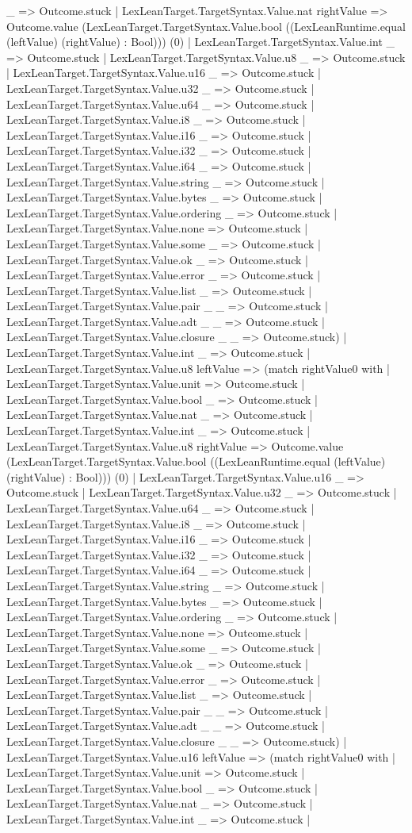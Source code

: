 \documentclass[11pt]{article}
\begin{document}
\_ => Outcome.stuck | LexLeanTarget.TargetSyntax.Value.nat rightValue => Outcome.value (LexLeanTarget.TargetSyntax.Value.bool ((LexLeanRuntime.equal (leftValue) (rightValue) : Bool))) (0) | LexLeanTarget.TargetSyntax.Value.int \_ => Outcome.stuck | LexLeanTarget.TargetSyntax.Value.u8 \_ => Outcome.stuck | LexLeanTarget.TargetSyntax.Value.u16 \_ => Outcome.stuck | LexLeanTarget.TargetSyntax.Value.u32 \_ => Outcome.stuck | LexLeanTarget.TargetSyntax.Value.u64 \_ => Outcome.stuck | LexLeanTarget.TargetSyntax.Value.i8 \_ => Outcome.stuck | LexLeanTarget.TargetSyntax.Value.i16 \_ => Outcome.stuck | LexLeanTarget.TargetSyntax.Value.i32 \_ => Outcome.stuck | LexLeanTarget.TargetSyntax.Value.i64 \_ => Outcome.stuck | LexLeanTarget.TargetSyntax.Value.string \_ => Outcome.stuck | LexLeanTarget.TargetSyntax.Value.bytes \_ => Outcome.stuck | LexLeanTarget.TargetSyntax.Value.ordering \_ => Outcome.stuck | LexLeanTarget.TargetSyntax.Value.none => Outcome.stuck | LexLeanTarget.TargetSyntax.Value.some \_ => Outcome.stuck | LexLeanTarget.TargetSyntax.Value.ok \_ => Outcome.stuck | LexLeanTarget.TargetSyntax.Value.error \_ => Outcome.stuck | LexLeanTarget.TargetSyntax.Value.list \_ => Outcome.stuck | LexLeanTarget.TargetSyntax.Value.pair \_ \_ => Outcome.stuck | LexLeanTarget.TargetSyntax.Value.adt \_ \_ => Outcome.stuck | LexLeanTarget.TargetSyntax.Value.closure \_ \_ => Outcome.stuck) | LexLeanTarget.TargetSyntax.Value.int \_ => Outcome.stuck | LexLeanTarget.TargetSyntax.Value.u8 leftValue => (match rightValue0 with | LexLeanTarget.TargetSyntax.Value.unit => Outcome.stuck | LexLeanTarget.TargetSyntax.Value.bool \_ => Outcome.stuck | LexLeanTarget.TargetSyntax.Value.nat \_ => Outcome.stuck | LexLeanTarget.TargetSyntax.Value.int \_ => Outcome.stuck | LexLeanTarget.TargetSyntax.Value.u8 rightValue => Outcome.value (LexLeanTarget.TargetSyntax.Value.bool ((LexLeanRuntime.equal (leftValue) (rightValue) : Bool))) (0) | LexLeanTarget.TargetSyntax.Value.u16 \_ => Outcome.stuck | LexLeanTarget.TargetSyntax.Value.u32 \_ => Outcome.stuck | LexLeanTarget.TargetSyntax.Value.u64 \_ => Outcome.stuck | LexLeanTarget.TargetSyntax.Value.i8 \_ => Outcome.stuck | LexLeanTarget.TargetSyntax.Value.i16 \_ => Outcome.stuck | LexLeanTarget.TargetSyntax.Value.i32 \_ => Outcome.stuck | LexLeanTarget.TargetSyntax.Value.i64 \_ => Outcome.stuck | LexLeanTarget.TargetSyntax.Value.string \_ => Outcome.stuck | LexLeanTarget.TargetSyntax.Value.bytes \_ => Outcome.stuck | LexLeanTarget.TargetSyntax.Value.ordering \_ => Outcome.stuck | LexLeanTarget.TargetSyntax.Value.none => Outcome.stuck | LexLeanTarget.TargetSyntax.Value.some \_ => Outcome.stuck | LexLeanTarget.TargetSyntax.Value.ok \_ => Outcome.stuck | LexLeanTarget.TargetSyntax.Value.error \_ => Outcome.stuck | LexLeanTarget.TargetSyntax.Value.list \_ => Outcome.stuck | LexLeanTarget.TargetSyntax.Value.pair \_ \_ => Outcome.stuck | LexLeanTarget.TargetSyntax.Value.adt \_ \_ => Outcome.stuck | LexLeanTarget.TargetSyntax.Value.closure \_ \_ => Outcome.stuck) | LexLeanTarget.TargetSyntax.Value.u16 leftValue => (match rightValue0 with | LexLeanTarget.TargetSyntax.Value.unit => Outcome.stuck | LexLeanTarget.TargetSyntax.Value.bool \_ => Outcome.stuck | LexLeanTarget.TargetSyntax.Value.nat \_ => Outcome.stuck | LexLeanTarget.TargetSyntax.Value.int \_ => Outcome.stuck | 
\end{document}
